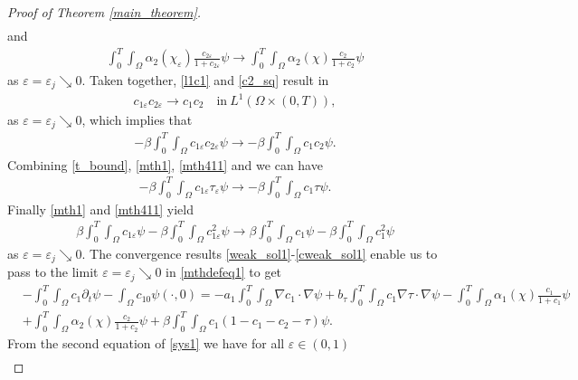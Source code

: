 \documentclass[a4paper,10pt]{article}
\theoremstyle{definition}
\begin{document}
\begin{proof}[Proof of Theorem \ref{main_theorem}]
\begin{align}
\end{align}
and
\begin{align}
 \label{weak_sol7}
 \int_0^T \int_\Omega \alpha_2(\chi_\varepsilon )\frac{c_{2\varepsilon}}{1 +  c_{2\varepsilon}} \psi \to \int_0^T \int_\Omega \alpha_2(\chi)\frac{c_{2}}{1 +  c_{2}} \psi
\end{align}
as $\varepsilon = \varepsilon_j \searrow 0$. Taken together, \eqref{l1c1} and \eqref{c2_sq} result in
\begin{align*}
  c_{1\varepsilon} c_{2\varepsilon} \to c_{1} c_{2} \quad \text{in}~L^{1}(\Omega \times (0, T)),
\end{align*}
as $\varepsilon = \varepsilon_j \searrow 0$, which implies that
\begin{align}
 \label{weak_sol8}
  - \beta \int_0^T \int_\Omega c_{1\varepsilon}c_{2\varepsilon} \psi \to -\beta \int_0^T \int_\Omega c_{1} c_{2} \psi.
\end{align}
Combining \eqref{t_bound}, \eqref{mth1}, \eqref{mth411} and \cite[Lemma 3.9]{tao2021global} we can have
\begin{align}
 \label{weak_sol9}
  - \beta \int_0^T \int_\Omega c_{1\varepsilon} \tau_\varepsilon \psi \to -\beta \int_0^T \int_\Omega c_{1} \tau \psi.
\end{align}
Finally \eqref{mth1} and \eqref{mth411} yield
\begin{align}
  \label{cweak_sol1}
   \beta \int_0^T \int_\Omega c_{1\varepsilon} \psi - \beta \int_0^T \int_\Omega  c_{1\varepsilon}^2 \psi \to  \beta \int_0^T \int_\Omega c_{1} \psi - \beta \int_0^T \int_\Omega  c_{1}^2 \psi
\end{align}
as $\varepsilon = \varepsilon_j \searrow 0$.  The convergence results \eqref{weak_sol1}-\eqref{cweak_sol1} enable us to pass to the limit $\varepsilon = \varepsilon_j \searrow 0$ in \eqref{mthdefeq1} to get
\begin{align}
   \label{wmthdefeq1}
  \nonumber  & - \int_0^T \int_\Omega c_{1} \partial_t \psi - \int_\Omega c_{10} \psi(\cdot, 0) = - a_1 \int_0^T \int_\Omega \nabla c_{1} \cdot \nabla \psi + b_\tau \int_0^T \int_\Omega c_{1} \nabla \tau \cdot \nabla \psi - \int_0^T \int_\Omega \alpha_1(\chi)\tfrac{c_{1}}{1 + c_{1}} \psi\\[5pt]
  & + \int_0^T \int_\Omega \alpha_2(\chi)\tfrac{c_{2}}{1 + c_2} \psi + \beta \int_0^T \int_\Omega c_{1}(1 - c_{1}  -  c_{2}  - \tau )\psi.
\end{align}
From the second equation of \eqref{sys1} we have for all $\varepsilon \in (0, 1)$
\begin{align}

\end{align}
\end{proof}
\end{document}

